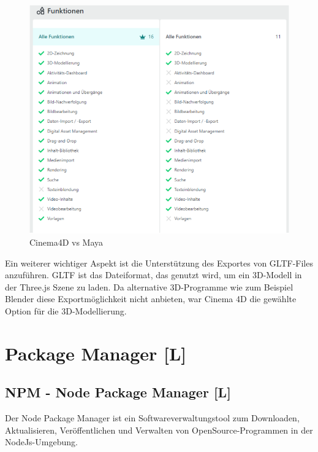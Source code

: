 \begin{figure} [h t]
    \centering
    \includegraphics[scale=0.7]{pics/c4d-vs-maya.PNG}
    \caption{Cinema4D vs Maya \cite{C4DvsMaya}}
    \label{fig:tech:front:c4d-vs-maya}
  \end{figure}

Ein weiterer wichtiger Aspekt ist die Unterstützung des Exportes von GLTF-Files anzuführen. GLTF ist das Dateiformat, das genutzt wird, um ein 3D-Modell in der Three.js Szene zu laden. Da alternative 3D-Programme wie zum Beispiel Blender diese Exportmöglichkeit nicht anbieten, war Cinema 4D die gewählte Option für die 3D-Modellierung.   

\section{Package Manager [L]}
\subsection{NPM - Node Package Manager [L]}
Der Node Package Manager ist ein Softwareverwaltungstool zum Downloaden, Aktualisieren, Veröffentlichen und Verwalten von OpenSource-Programmen in der NodeJs-Umgebung. \cite{whatNpm} \cite{AboutNpm}


